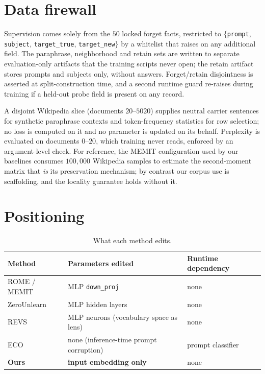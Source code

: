 \documentclass[11pt]{article}
\begin{document}
\section{Data firewall}

Supervision comes solely from the $50$ locked forget facts, restricted to
$\{$\texttt{prompt}, \texttt{subject}, \texttt{target\_true},
\texttt{target\_new}$\}$ by a whitelist that raises on any additional field.
The paraphrase, neighborhood and retain sets are written to separate
evaluation-only artifacts that the training scripts never open; the retain
artifact stores prompts and subjects only, without answers. Forget/retain
disjointness is asserted at split-construction time, and a second runtime guard
re-raises during training if a held-out probe field is present on any record.

A disjoint Wikipedia slice (documents $20$--$5020$) supplies neutral carrier
sentences for synthetic paraphrase contexts and token-frequency statistics for
row selection; no loss is computed on it and no parameter is updated on its
behalf. Perplexity is evaluated on documents $0$--$20$, which training never
reads, enforced by an argument-level check. For reference, the MEMIT
configuration used by our baselines consumes $100{,}000$ Wikipedia samples to
estimate the second-moment matrix that \emph{is} its preservation mechanism; by
contrast our corpus use is scaffolding, and the locality guarantee holds
without it.

\section{Positioning}

\begin{table}[h]
\centering
\caption{What each method edits.}
\begin{tabular}{lll}
\toprule
Method & Parameters edited & Runtime dependency \\
\midrule
ROME / MEMIT      & MLP \texttt{down\_proj}                 & none \\
ZeroUnlearn       & MLP hidden layers                       & none \\
REVS              & MLP neurons (vocabulary space as lens)  & none \\
ECO               & none (inference-time prompt corruption) & prompt classifier \\
\textbf{Ours}     & \textbf{input embedding only}           & none \\
\bottomrule
\end{tabular}
\end{table}
\end{document}
